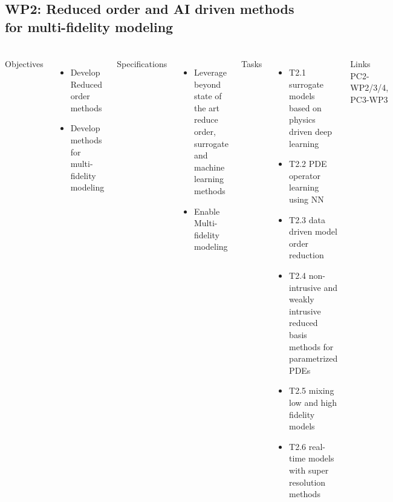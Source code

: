 \subsection{WP2: Reduced order and AI driven methods for multi-fidelity modeling} 
\begin{frame}
  \frametitle{\insertsectionhead}
  \framesubtitle{\insertsubsectionhead}
\footnotesize
  \begin{columns}[t]
    Objectives
    \begin{itemize}
      \item Develop Reduced order methods 
      \item Develop methods for multi-fidelity modeling 
    \end{itemize}

      Specifications
      \begin{itemize}
        \item Leverage beyond state of the art reduce order, surrogate and machine learning methods
        \item Enable Multi-fidelity modeling
      \end{itemize}
    Tasks
    \begin{itemize}
      \item T2.1 surrogate models based on physics driven deep learning
      \item T2.2 PDE operator learning using NN
      \item T2.3 data driven model order reduction
      \item T2.4 non-intrusive and weakly intrusive reduced basis methods for parametrized PDEs
      \item T2.5 mixing low and high fidelity models
      \item T2.6 real-time models with super resolution methods
    \end{itemize}
    \begin{alertblock}{Links}
      PC2-WP2/3/4, PC3-WP3
    \end{alertblock}

  \end{columns}
\end{frame}

